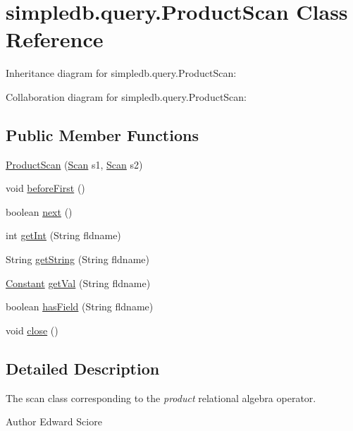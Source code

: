 \hypertarget{classsimpledb_1_1query_1_1ProductScan}{}\section{simpledb.\+query.\+Product\+Scan Class Reference}
\label{classsimpledb_1_1query_1_1ProductScan}


Inheritance diagram for simpledb.\+query.\+Product\+Scan\+:


Collaboration diagram for simpledb.\+query.\+Product\+Scan\+:
\subsection*{Public Member Functions}
\begin{DoxyCompactItemize}
\item 
\hyperlink{classsimpledb_1_1query_1_1ProductScan_adfac2583e7ed22b4b1e31d6d85c6be38}{Product\+Scan} (\hyperlink{interfacesimpledb_1_1query_1_1Scan}{Scan} s1, \hyperlink{interfacesimpledb_1_1query_1_1Scan}{Scan} s2)
\item 
void \hyperlink{classsimpledb_1_1query_1_1ProductScan_a2b5520d561ce26d401b4744f637a4d76}{before\+First} ()
\item 
boolean \hyperlink{classsimpledb_1_1query_1_1ProductScan_a5c467cd753d2b088b96b649c7b8cf420}{next} ()
\item 
int \hyperlink{classsimpledb_1_1query_1_1ProductScan_a7b94328d04d2d0bf10f460d6abfc9299}{get\+Int} (String fldname)
\item 
String \hyperlink{classsimpledb_1_1query_1_1ProductScan_a2fda3abb7dc55d443791b8e5664ef1e3}{get\+String} (String fldname)
\item 
\hyperlink{classsimpledb_1_1query_1_1Constant}{Constant} \hyperlink{classsimpledb_1_1query_1_1ProductScan_ade690f4d248b8d489e9565bb73e0cf59}{get\+Val} (String fldname)
\item 
boolean \hyperlink{classsimpledb_1_1query_1_1ProductScan_a06c138c93e98cede58b6421c93aa451d}{has\+Field} (String fldname)
\item 
void \hyperlink{classsimpledb_1_1query_1_1ProductScan_a58ee47fd6a8b397c3ad386fd7f3d257e}{close} ()
\end{DoxyCompactItemize}


\subsection{Detailed Description}
The scan class corresponding to the {\itshape product} relational algebra operator. \begin{DoxyAuthor}{Author}
Edward Sciore 
\end{DoxyAuthor}


